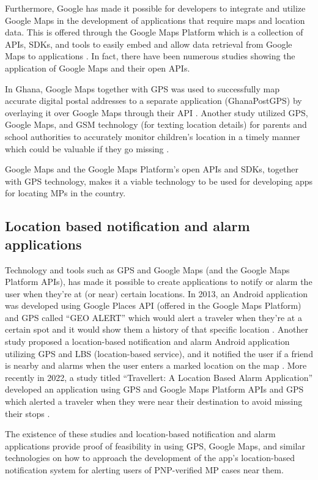 Furthermore, Google has made it possible for developers to integrate and utilize Google Maps in the development of applications that require maps and location data. This is offered through the Google Maps Platform which is a collection of APIs, SDKs, and tools to easily embed and allow data retrieval from Google Maps to applications \cite{googleDevelopers}. In fact, there have been numerous studies showing the application of Google Maps and their open APIs. 

In Ghana, Google Maps together with GPS was used to successfully map accurate digital postal addresses to a separate application (GhanaPostGPS) by overlaying it over Google Maps through their API \cite{gah2018using}. Another study utilized GPS, Google Maps, and GSM technology (for texting location details) for parents and school authorities to accurately monitor children’s location in a timely manner which could be valuable if they go missing \cite{sunehra2016children}.

Google Maps and the Google Maps Platform’s open APIs and SDKs, together with GPS technology, makes it a viable technology to be used for developing apps for locating MPs in the country.

\subsection{Location based notification and alarm applications}

Technology and tools such as GPS and Google Maps (and the Google Maps Platform APIs), has made it possible to create applications to notify or alarm the user when they’re at (or near) certain locations. In 2013, an Android application was developed using Google Places API (offered in the Google Maps Platform) and GPS called “GEO ALERT” which would alert a traveler when they’re at a certain spot and it would show them a history of that specific location \cite{garg2013geo}. Another study proposed a location-based notification and alarm Android application utilizing GPS and LBS (location-based service), and it notified the user if a friend is nearby and alarms when the user enters a marked location on the map \cite{kanfade2018location}. More recently in 2022, a study titled “Travellert: A Location Based Alarm Application” developed an application using GPS and Google Maps Platform APIs and GPS which alerted a traveler when they were near their destination to avoid missing their stops \cite{travellert}.

The existence of these studies and location-based notification and alarm applications provide proof of feasibility in using GPS, Google Maps, and similar technologies on how to approach the development of the app’s location-based notification system for alerting users of PNP-verified MP cases near them.

